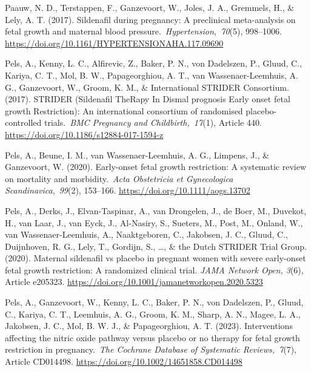 \documentclass[authordate, reflection]{jote-new-article}
\begin{document}
	Paauw, N. D., Terstappen, F., Ganzevoort, W., Joles, J. A., Gremmels, H., \& Lely, A. T. (2017). Sildenafil during pregnancy: A preclinical meta-analysis on fetal growth and maternal blood pressure. \emph{Hypertension, 70}(5), 998--1006. \url{https://doi.org/10.1161/HYPERTENSIONAHA.117.09690}







	Pels, A., Kenny, L. C., Alfirevic, Z., Baker, P. N., von Dadelszen, P., Gluud, C., Kariya, C. T., Mol, B. W., Papageorghiou, A. T., van Wassenaer-Leemhuis, A. G., Ganzevoort, W., Groom, K. M., \& International STRIDER Consortium. (2017). STRIDER (Sildenafil TheRapy In Dismal prognosis Early onset fetal growth Restriction): An international consortium of randomised placebo-controlled trials. \emph{BMC Pregnancy and Childbirth, 17}(1), Article 440. \url{https://doi.org/10.1186/s12884-017-1594-z}







	Pels, A., Beune, I. M., van Wassenaer-Leemhuis, A. G., Limpens, J., \& Ganzevoort, W. (2020). Early-onset fetal growth restriction: A systematic review on mortality and morbidity. \emph{Acta Obstetricia et Gynecologica Scandinavica}, \emph{99}(2), 153--166. \url{https://doi.org/10.1111/aogs.13702}







	Pels, A., Derks, J., Elvan-Taspinar, A., van Drongelen, J., de Boer, M., Duvekot, H., van Laar, J., van Eyck, J., Al-Nasiry, S., Sueters, M., Post, M., Onland, W., van Wassenaer-Leemhuis, A., Naaktgeboren, C., Jakobsen, J. C., Gluud, C., Duijnhoven, R. G., Lely, T., Gordijn, S., …, \& the Dutch STRIDER Trial Group. (2020). Maternal sildenafil vs placebo in pregnant women with severe early-onset fetal growth restriction: A randomized clinical trial. \emph{JAMA Network Open, 3}(6), Article e205323. \url{https://doi.org/10.1001/jamanetworkopen.2020.5323}







	Pels, A., Ganzevoort, W., Kenny, L. C., Baker, P. N., von Dadelszen, P., Gluud, C., Kariya, C. T., Leemhuis, A. G., Groom, K. M., Sharp, A. N., Magee, L. A., Jakobsen, J. C., Mol, B. W. J., \& Papageorghiou, A. T. (2023). Interventions affecting the nitric oxide pathway versus placebo or no therapy for fetal growth restriction in pregnancy. \emph{The Cochrane Database of Systematic Reviews, 7}(7), Article CD014498. \url{https://doi.org/10.1002/14651858.CD014498}
\end{document}
